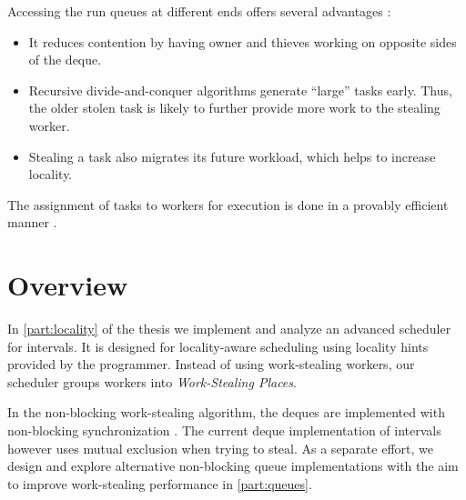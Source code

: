 Accessing the run queues at different ends offers several advantages
\cite{Frigo1998}:

\begin{itemize}
\item It reduces contention by having owner and thieves working on
  opposite sides of the deque.
\item Recursive divide-and-conquer algorithms generate ``large'' tasks
  early. Thus, the older stolen task is likely to further provide more
  work to the stealing worker.
\item Stealing a task also migrates its future workload, which helps
  to increase locality.
\end{itemize}

The assignment of tasks to workers for execution is done in a provably
efficient manner \cite{Blumofe1995, Blumofe1999}.


\section{Overview}
\label{sec:intro-overview}

In \autoref{part:locality} of the thesis we implement and analyze an
advanced scheduler for intervals. It is designed for locality-aware
scheduling using locality hints provided by the programmer. Instead of
using work-stealing workers, our scheduler groups workers into
\emph{Work-Stealing Places}.

In the non-blocking work-stealing algorithm, the deques are
implemented with non-blocking synchronization \cite{Arora1998}. The
current deque implementation of intervals however uses mutual
exclusion when trying to steal. As a separate effort, we design and
explore alternative non-blocking queue implementations with the aim to
improve work-stealing performance in \autoref{part:queues}.


